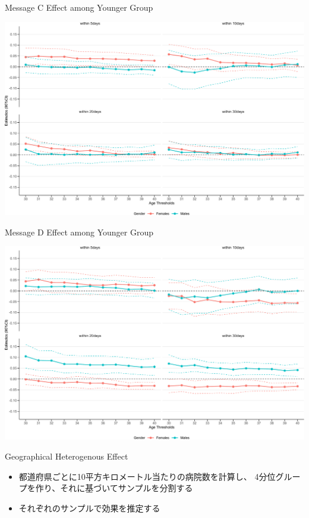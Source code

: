 \documentclass[
      aspectratio=169,
        12pt,
    ]{beamer}
\providecommand{\tightlist}{%
  \setlength{\itemsep}{0pt}\setlength{\parskip}{0pt}}
\begin{document}
\begin{frame}{Message C Effect among Younger Group}
\protect\hypertarget{message-c-effect-among-younger-group-1}{}
\begin{center}\includegraphics[width=0.75\linewidth]{report_files/figure-beamer/plotC-change-age-threshold-secondary-1} \end{center}
\end{frame}

\begin{frame}{Message D Effect among Younger Group}
\protect\hypertarget{message-d-effect-among-younger-group-1}{}
\begin{center}\includegraphics[width=0.75\linewidth]{report_files/figure-beamer/plotD-change-age-threshold-secondary-1} \end{center}
\end{frame}

\begin{frame}{Geographical Heterogenous Effect}
\protect\hypertarget{geographical-heterogenous-effect-1}{}
\begin{itemize}
\tightlist
\item
  都道府県ごとに10平方キロメートル当たりの病院数を計算し、
  4分位グループを作り、それに基づいてサンプルを分割する
\item
  それぞれのサンプルで効果を推定する
\end{itemize}
\end{frame}
\end{document}
